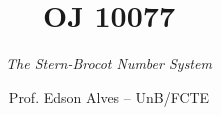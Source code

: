 \title{OJ 10077}
\subtitle{\textit{The Stern-Brocot Number System}}
\author{Prof. Edson Alves -- UnB/FCTE}
\date{}
